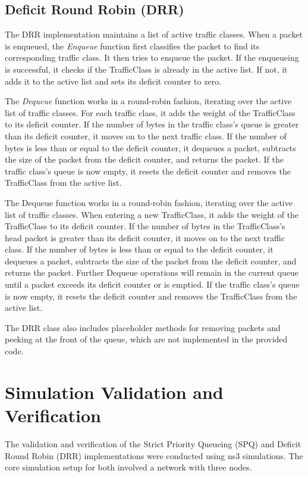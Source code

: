 \documentclass{article}
\begin{document}
\subsection{Deficit Round Robin (DRR)}

The DRR implementation maintains a list of active traffic classes. When a packet is enqueued, the \textit{Enqueue} function first classifies the packet to find its corresponding traffic class. It then tries to enqueue the packet. If the enqueueing is successful, it checks if the TrafficClass is already in the active list. If not, it adds it to the active list and sets its deficit counter to zero.

The \textit{Dequeue} function works in a round-robin fashion, iterating over the active list of traffic classes. For each traffic class, it adds the weight of the TrafficClass to its deficit counter. If the number of bytes in the traffic class's queue is greater than its deficit counter, it moves on to the next traffic class. If the number of bytes is less than or equal to the deficit counter, it dequeues a packet, subtracts the size of the packet from the deficit counter, and returns the packet. If the traffic class's queue is now empty, it resets the deficit counter and removes the TrafficClass from the active list.

The Dequeue function works in a round-robin fashion, iterating over the active list of traffic classes. When entering a new TrafficClass, it adds the weight of the TrafficClass to its deficit counter. If the number of bytes in the TrafficClass's head packet is greater than its deficit counter, it moves on to the next traffic class.
If the number of bytes is less than or equal to the deficit counter, it dequeues a packet, subtracts the size of the packet from the deficit counter, and returns the packet. Further Dequeue operations will remain in the current queue until a packet exceeds its deficit counter or is emptied. If the traffic class’s queue is now empty, it resets the deficit counter and removes the TrafficClass from the active list.

The DRR class also includes placeholder methods for removing packets and peeking at the front of the queue, which are not implemented in the provided code.

\section{Simulation Validation and Verification}

The validation and verification of the Strict Priority Queueing (SPQ) and Deficit Round Robin (DRR) implementations were conducted using ns3 simulations. The core simulation setup for both involved a network with three nodes. 
\end{document}
